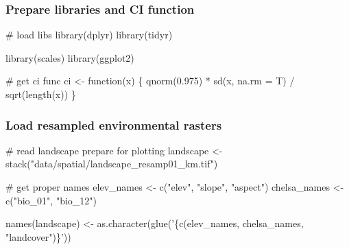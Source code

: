 \documentclass[]{article}
\newenvironment{Shaded}{}{}
\newcommand{\CommentTok}[1]{\textcolor[rgb]{0.00,0.50,0.00}{#1}}
\newcommand{\ControlFlowTok}[1]{\textcolor[rgb]{0.00,0.00,1.00}{#1}}
\newcommand{\DataTypeTok}[1]{#1}
\newcommand{\FloatTok}[1]{#1}
\newcommand{\KeywordTok}[1]{\textcolor[rgb]{0.00,0.00,1.00}{#1}}
\newcommand{\NormalTok}[1]{#1}
\newcommand{\OperatorTok}[1]{#1}
\newcommand{\StringTok}[1]{\textcolor[rgb]{0.00,0.50,0.50}{#1}}
\begin{document}
\hypertarget{prepare-libraries-and-ci-function}{%
\subsubsection{Prepare libraries and CI function}\label{prepare-libraries-and-ci-function}}

\begin{Shaded}
\begin{Highlighting}[]
\CommentTok{# load libs}
\KeywordTok{library}\NormalTok{(dplyr)}
\KeywordTok{library}\NormalTok{(tidyr)}

\KeywordTok{library}\NormalTok{(scales)}
\KeywordTok{library}\NormalTok{(ggplot2)}

\CommentTok{# get ci func}
\NormalTok{ci <-}\StringTok{ }\ControlFlowTok{function}\NormalTok{(x) \{}
  \KeywordTok{qnorm}\NormalTok{(}\FloatTok{0.975}\NormalTok{) }\OperatorTok{*}\StringTok{ }\KeywordTok{sd}\NormalTok{(x, }\DataTypeTok{na.rm =}\NormalTok{ T) }\OperatorTok{/}\StringTok{ }\KeywordTok{sqrt}\NormalTok{(}\KeywordTok{length}\NormalTok{(x))}
\NormalTok{\}}
\end{Highlighting}
\end{Shaded}

\hypertarget{load-resampled-environmental-rasters}{%
\subsubsection{Load resampled environmental rasters}\label{load-resampled-environmental-rasters}}

\begin{Shaded}
\begin{Highlighting}[]
\CommentTok{# read landscape prepare for plotting}
\NormalTok{landscape <-}\StringTok{ }\KeywordTok{stack}\NormalTok{(}\StringTok{"data/spatial/landscape_resamp01_km.tif"}\NormalTok{)}

\CommentTok{# get proper names}
\NormalTok{elev_names <-}\StringTok{ }\KeywordTok{c}\NormalTok{(}\StringTok{"elev"}\NormalTok{, }\StringTok{"slope"}\NormalTok{, }\StringTok{"aspect"}\NormalTok{)}
\NormalTok{chelsa_names <-}\StringTok{ }\KeywordTok{c}\NormalTok{(}\StringTok{"bio_01"}\NormalTok{, }\StringTok{"bio_12"}\NormalTok{)}

\KeywordTok{names}\NormalTok{(landscape) <-}\StringTok{ }\KeywordTok{as.character}\NormalTok{(}\KeywordTok{glue}\NormalTok{(}\StringTok{'\{c(elev_names, chelsa_names, "landcover")\}'}\NormalTok{))}
\end{Highlighting}
\end{Shaded}
\end{document}
